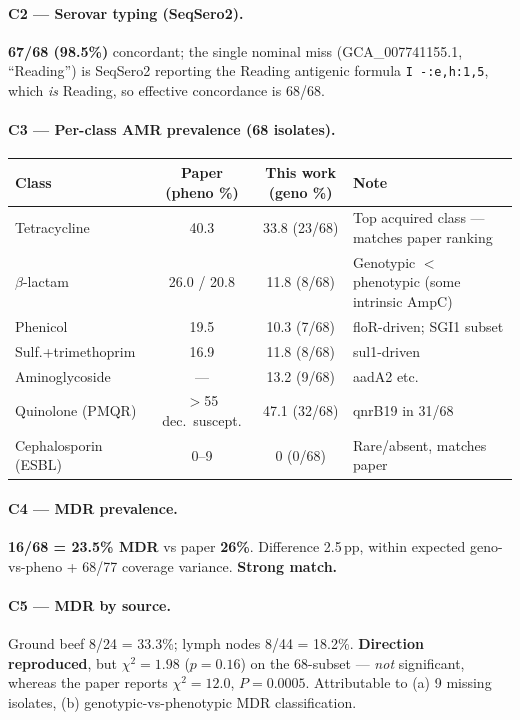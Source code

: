 \documentclass[11pt]{article}
\begin{document}
\paragraph{C2 --- Serovar typing (SeqSero2).}
\textbf{67/68 (98.5\%)} concordant; the single nominal miss (GCA\_007741155.1, ``Reading'') is SeqSero2
reporting the Reading antigenic formula \texttt{I -:e,h:1,5}, which \emph{is} Reading, so effective
concordance is 68/68.

\paragraph{C3 --- Per-class AMR prevalence (68 isolates).}
\begin{center}
\begin{tabular}{lccl}
\toprule
Class & Paper (pheno \%) & This work (geno \%) & Note \\
\midrule
Tetracycline           & 40.3 & 33.8 (23/68) & Top acquired class --- matches paper ranking \\
$\beta$-lactam         & 26.0 / 20.8 & 11.8 (8/68) & Genotypic $<$ phenotypic (some intrinsic AmpC) \\
Phenicol               & 19.5 & 10.3 (7/68)  & floR-driven; SGI1 subset \\
Sulf.+trimethoprim     & 16.9 & 11.8 (8/68)  & sul1-driven \\
Aminoglycoside         & ---  & 13.2 (9/68)  & aadA2 etc. \\
Quinolone (PMQR)       & $>$55 dec.\ suscept. & 47.1 (32/68) & qnrB19 in 31/68 \\
Cephalosporin (ESBL)   & 0--9 & 0 (0/68)     & Rare/absent, matches paper \\
\bottomrule
\end{tabular}
\end{center}

\paragraph{C4 --- MDR prevalence.}
\textbf{16/68 = 23.5\% MDR} vs paper \textbf{26\%}. Difference 2.5\,pp, within expected geno-vs-pheno +
68/77 coverage variance. \textbf{Strong match.}

\paragraph{C5 --- MDR by source.}
Ground beef 8/24 = 33.3\%; lymph nodes 8/44 = 18.2\%. \textbf{Direction reproduced}, but $\chi^2=1.98$
($p=0.16$) on the 68-subset --- \emph{not} significant, whereas the paper reports $\chi^2=12.0$, $P=0.0005$.
Attributable to (a) 9 missing isolates, (b) genotypic-vs-phenotypic MDR classification.
\end{document}
